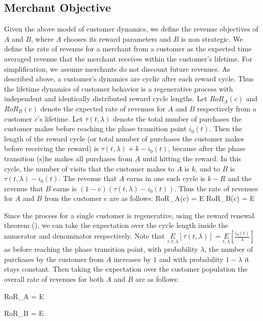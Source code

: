 \subsection{Merchant Objective}
Given the above model of customer dynamics, we define the revenue objectives of $A$ and $B$, where $A$ chooses its reward parameters and $B$ is non strategic. 
We define the rate of revenue for a merchant from a customer as the expected time averaged revenue that the merchant receives within the customer's lifetime.
For simplification, we assume merchants do not discount future revenues.
As described above, a customer's dynamics are cyclic after each reward cycle.
Thus the lifetime dynamics of customer behavior is a regenerative process with independent and identically distributed reward cycle lengths.
Let $RoR_A(c)$ and $RoR_B(c)$ denote the expected rate of revenues for $A$ and $B$ respectively from a customer $c$'s lifetime.
Let $\tau(t, \lambda)$ denote the total number of purchases the customer makes before reaching the phase transition point $i_0(t)$.
Then the length of the reward cycle (or total number of purchases the customer makes before receiving the reward) is $\tau(t, \lambda) + k - i_0(t)$, because after the phase transition (s)he makes all purchases from $A$ until hitting the reward.
In this cycle, the number of visits that the customer makes to $A$ is $k$, and to $B$ is $\tau(t,\lambda) - i_0(t)$.
The revenue that $A$ earns in one such cycle is $k-R$ and the revenue that $B$ earns is $(1-v)(\tau(t,\lambda) - i_0(t))$.
Thus the rate of revenues for $A$ and $B$ from the customer $c$ are as follows:
\beq
RoR_A(c) = E\notag
\eeq
\beq
RoR_B(c) = E\notag
\eeq

Since the process for a single customer is regenerative, using the reward renewal theorem (\cite{10.2307/1426216}), we can take the expectation over the cycle length inside the numerator and denominator respectively.
Note that $\underset{\tau, t, \lambda}E[\tau(t,\lambda)] = \underset{t, \lambda} E\left[\frac{i_0(t)}{\lambda}\right]$ as before reaching the phase transition point, with probability $\lambda$, the number of purchases by the customer from $A$ increases by $1$ and with probability $1-\lambda$ it stays constant.
Then taking the expectation over the customer population the overall rate of revenues for both $A$ and $B$ are as follows:

\beq
RoR_A = E
\eeq

\beq
RoR_B = E
\eeq
